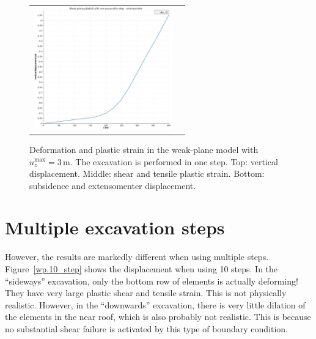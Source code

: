\documentclass[]{scrreprt}
\begin{document}
\begin{figure}[p]
\begin{center}
\begin{tabular}{cc}
\includegraphics[width=6cm]{wp_only_one_step_extensometer.pdf}
\end{tabular}
\caption{Deformation and plastic strain in the weak-plane model with
  $u_{z}^{\mathrm{max}} = 3$\,m.  The excavation is performed in one step.  Top:
  vertical displacement.  Middle: shear and tensile plastic strain.
  Bottom: subsidence and extensomenter displacement.}
\label{wp.one_step}
\end{center}
\end{figure}

\section{Multiple excavation steps}

However, the results are markedly different when using multiple
steps.  Figure~\ref{wp.10_step} shows the displacement when using 10
steps.  In the ``sideways'' excavation, only the bottom row of
elements is actually deforming!  They have very large plastic shear
and tensile strain.  This is not physically realistic.  However, in
the ``downwards'' excavation, there is very little dilation of the
elements in the near roof, which is also probably not realistic.  This
is because no substantial shear failure is activated by this type of
boundary condition.
\end{document}
